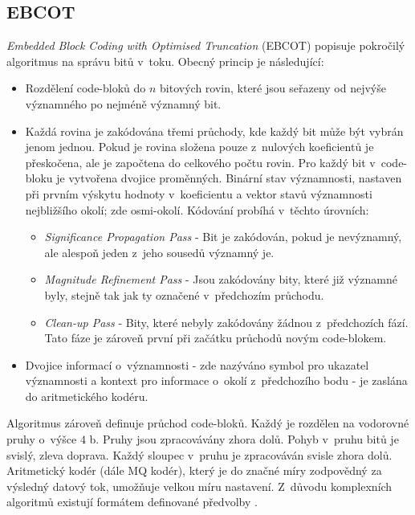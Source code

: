 \subsection*{EBCOT}
\textit{Embedded Block Coding with Optimised Truncation} (EBCOT) \cite{ebcot} popisuje pokročilý algoritmus na správu bitů v~toku. 
Obecný princip je následující:
\begin{itemize}
  \item{Rozdělení code-bloků do $n$ bitových rovin, které jsou seřazeny od nejvýše významného po nejméně významný bit.}
  \item{Každá rovina je zakódována třemi průchody, kde každý bit může být vybrán jenom jednou. Pokud je rovina složena pouze z~nulových koeficientů je přeskočena, ale je započtena do celkového počtu rovin. Pro každý bit v~code-bloku je vytvořena dvojice proměnných. Binární stav významnosti, nastaven při prvním výskytu hodnoty v~koeficientu a vektor stavů významnosti nejbližšího okolí; zde osmi-okolí. Kódování probíhá v~těchto úrovních:}
  \begin{itemize}
    \item \textit{Significance Propagation Pass} - Bit je zakódován, pokud je nevýznamný, ale alespoň jeden z~jeho sousedů významný je.
    \item \textit{Magnitude Refinement Pass} - Jsou zakódovány bity, které již významné byly, stejně tak jak ty označené v~předchozím průchodu.
    \item \textit{Clean-up Pass} - Bity, které nebyly zakódovány žádnou z~předchozích fází. Tato fáze je zároveň první při začátku průchodů novým code-blokem.
  \end{itemize}
  \item Dvojice informací o~významnosti - zde nazýváno symbol pro ukazatel významnosti a kontext pro informace o~okolí z~předchozího bodu - je zaslána do aritmetického kodéru.
\end{itemize}
Algoritmus zároveň definuje průchod code-bloků. Každý je rozdělen na vodorovné pruhy o~výšce $4$ b. Pruhy jsou zpracovávány zhora dolů. Pohyb v~pruhu bitů je svislý, zleva doprava. Každý sloupec v~pruhu je zpracováván svisle zhora dolů. Aritmetický kodér (dále MQ kodér), který je do značné míry zodpovědný za výsledný datový tok, umožňuje velkou míru nastavení. Z~důvodu komplexních algoritmů existují formátem definované předvolby \cite{kniha}.

